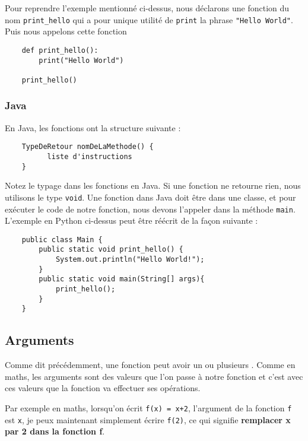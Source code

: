 Pour reprendre l'exemple mentionné ci-dessus, nous déclarons une fonction du nom \lstinline{print_hello} qui a pour unique utilité de \lstinline{print} la phrase \lstinline{"Hello World"}. Puis nous appelons cette fonction \\

\begin{verbatim}
    def print_hello():
        print("Hello World")
        
    print_hello()
\end{verbatim}

\subsubsection{Java}
En Java, les fonctions ont la structure suivante :

\begin{verbatim}
    TypeDeRetour nomDeLaMethode() {
          liste d'instructions
    }
\end{verbatim}

Notez le typage dans les fonctions en Java. Si une fonction ne retourne rien, nous utilisons le type \lstinline{void}. Une fonction dans Java doit être dans une classe, et pour exécuter le code de notre fonction, nous devons l'appeler dans la méthode \lstinline{main}. L'exemple en Python ci-dessus peut être réécrit de la façon suivante :  

\begin{verbatim}
    public class Main {
        public static void print_hello() {
            System.out.println("Hello World!"); 
        }
        public static void main(String[] args){
            print_hello();
        }
    }
\end{verbatim}

\subsection{Arguments}

Comme dit précédemment, une fonction peut avoir un ou plusieurs . Comme en maths, les arguments sont des valeurs que l'on passe à notre fonction et c'est avec ces valeurs que la fonction va effectuer ses opérations.

Par exemple en maths, lorsqu'on écrit \lstinline{f(x) = x+2}, l'argument de la fonction \lstinline{f} est \lstinline{x}, je peux maintenant simplement écrire \lstinline{f(2)}, ce qui signifie \textbf{remplacer x par 2 dans la fonction f}.

